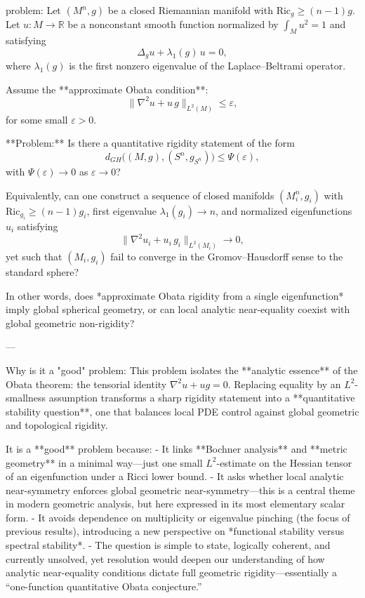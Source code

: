 problem:  
Let \((M^n,g)\) be a closed Riemannian manifold with \(\mathrm{Ric}_g \ge (n-1)g\).  
Let \(u\colon M\to\mathbb{R}\) be a nonconstant smooth function normalized by \(\int_M u^2 = 1\) and satisfying  
\[
\Delta_g u + \lambda_1(g)\, u = 0,
\]
where \(\lambda_1(g)\) is the first nonzero eigenvalue of the Laplace–Beltrami operator.  

Assume the **approximate Obata condition**:  
\[
\|\nabla^2 u + u\,g\|_{L^2(M)} \le \varepsilon,
\]
for some small \(\varepsilon>0\).

**Problem:**  
Is there a quantitative rigidity statement of the form  
\[
d_{GH}\big((M,g),(S^n,g_{S^n})\big)\le \Psi(\varepsilon),
\]
with \(\Psi(\varepsilon)\to 0\) as \(\varepsilon\to 0\)?  

Equivalently, can one construct a sequence of closed manifolds \((M_i^n,g_i)\) with
\(\mathrm{Ric}_{g_i}\ge (n-1)g_i\), first eigenvalue \(\lambda_1(g_i)\to n\), and normalized eigenfunctions \(u_i\) satisfying  
\[
\|\nabla^2 u_i + u_i\, g_i\|_{L^2(M_i)}\to 0,
\]
yet such that \((M_i,g_i)\) fail to converge in the Gromov–Hausdorff sense to the standard sphere?  

In other words, does *approximate Obata rigidity from a single eigenfunction* imply global spherical geometry, or can local analytic near-equality coexist with global geometric non-rigidity?

---

Why is it a "good" problem:  
This problem isolates the **analytic essence** of the Obata theorem: the tensorial identity \(\nabla^2 u + ug = 0\). Replacing equality by an \(L^2\)-smallness assumption transforms a sharp rigidity statement into a **quantitative stability question**, one that balances local PDE control against global geometric and topological rigidity.  

It is a **good** problem because:  
- It links **Bochner analysis** and **metric geometry** in a minimal way—just one small \(L^2\)-estimate on the Hessian tensor of an eigenfunction under a Ricci lower bound.  
- It asks whether local analytic near-symmetry enforces global geometric near-symmetry—this is a central theme in modern geometric analysis, but here expressed in its most elementary scalar form.  
- It avoids dependence on multiplicity or eigenvalue pinching (the focus of previous results), introducing a new perspective on *functional stability versus spectral stability*.  
- The question is simple to state, logically coherent, and currently unsolved, yet resolution would deepen our understanding of how analytic near-equality conditions dictate full geometric rigidity—essentially a “one-function quantitative Obata conjecture.”